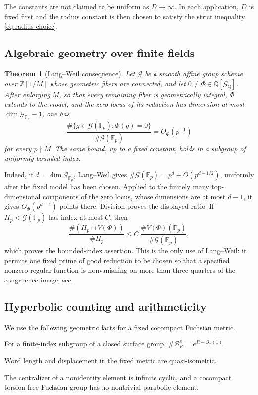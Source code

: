\documentclass[11pt,reqno]{amsart}
\newtheorem{theorem}{Theorem}[section]
\theoremstyle{definition}
\theoremstyle{remark}
\newcommand{\Q}{\mathbb Q}
\newcommand{\Z}{\mathbb Z}
\newcommand{\F}{\mathbb F}
\newcommand{\cB}{\mathcal B}
\begin{document}
The constants are not claimed to be uniform as \(D\to\infty\).  In each
application, \(D\) is fixed first and the radius constant is then chosen to
satisfy the strict inequality \eqref{eq:radius-choice}.

\subsection{Algebraic geometry over finite fields}

\begin{theorem}[Lang--Weil consequence]
\label{input:lang-weil}
Let \(\mathcal G\) be a smooth affine group scheme over
\(\Z[1/M]\) whose geometric fibers are connected, and let
\(0\ne\Phi\in\Q[\mathcal G_\Q]\).  After enlarging \(M\), so that every
remaining fiber is geometrically integral, \(\Phi\) extends to the model,
and the zero locus of its reduction has dimension at most
\(\dim\mathcal G_{\mathbb F_p}-1\), one has
\[
 \frac{\#\{g\in\mathcal G(\F_p):\Phi(g)=0\}}
      {\#\mathcal G(\F_p)}
 =O_\Phi(p^{-1})
\]
for every \(p\nmid M\).  The same bound, up to a fixed constant, holds in a
subgroup of uniformly bounded index.
\end{theorem}

Indeed, if \(d=\dim\mathcal G_{\mathbb F_p}\), Lang--Weil gives
\(\#\mathcal G(\mathbb F_p)=p^d+O(p^{d-1/2})\), uniformly after the fixed
model has been chosen.  Applied to the finitely many top-dimensional
components of the zero locus, whose dimensions are at most \(d-1\), it
gives \(O_\Phi(p^{d-1})\) points there.  Division proves the displayed
ratio.  If \(H_p<\mathcal G(\mathbb F_p)\) has index at most \(C\), then
\[
 \frac{\#(H_p\cap V(\Phi))}{\#H_p}
 \le C\,\frac{\#V(\Phi)(\mathbb F_p)}
              {\#\mathcal G(\mathbb F_p)},
\]
which proves the bounded-index assertion.  This is the only use of
Lang--Weil: it permits one fixed prime of good reduction to be chosen so
that a specified nonzero regular function is nonvanishing on more than
three quarters of the congruence image; see \cite{LangWeil}.

\subsection{Hyperbolic counting and arithmeticity}

We use the following geometric facts for a fixed cocompact Fuchsian metric.

\begin{description}[style=nextline,leftmargin=2.7cm]
\item[Orbit counting]
For a finite-index subgroup of a closed surface group,
\(\#\cB_R^x=e^{R+O_x(1)}\).
\item[Metric comparison]
Word length and displacement in the fixed metric are quasi-isometric.
\item[Centralizers]
The centralizer of a nonidentity element is infinite cyclic, and a cocompact
torsion-free Fuchsian group has no nontrivial parabolic element.
\end{description}
\end{document}
